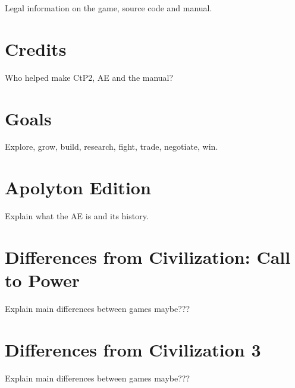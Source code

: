 Legal information on the game, source code and manual.

\section{Credits}

Who helped make CtP2, AE and the manual?

\section{Goals}

Explore, grow, build, research, fight, trade, negotiate, win.

\section{Apolyton Edition}

Explain what the AE is and its history.

\section{Differences from Civilization: Call to Power}

Explain main differences between games maybe???

\section{Differences from Civilization 3}

Explain main differences between games maybe???

